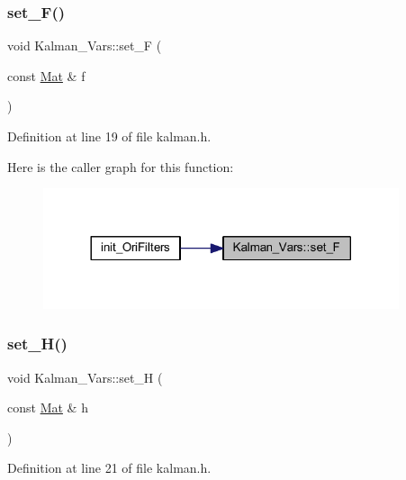 \subsubsection{\texorpdfstring{set\_F()}{set\_F()}}
{\footnotesize\ttfamily void Kalman\+\_\+\+Vars\+::set\+\_\+F (\begin{DoxyParamCaption}\item[{const \mbox{\hyperlink{class_mat}{Mat}} \&}]{f }\end{DoxyParamCaption})\hspace{0.3cm}{\ttfamily [inline]}}



Definition at line 19 of file kalman.\+h.

Here is the caller graph for this function\+:
\nopagebreak
\begin{figure}[H]
\begin{center}
\leavevmode
\includegraphics[width=296pt]{struct_kalman___vars_aaa0914f751fcdac78284162f6c8c2a74_icgraph}
\end{center}
\end{figure}
\mbox{\label{struct_kalman___vars_ac46252628322507a132ae399227a6d18}} 
\subsubsection{\texorpdfstring{set\_H()}{set\_H()}}
{\footnotesize\ttfamily void Kalman\+\_\+\+Vars\+::set\+\_\+H (\begin{DoxyParamCaption}\item[{const \mbox{\hyperlink{class_mat}{Mat}} \&}]{h }\end{DoxyParamCaption})\hspace{0.3cm}{\ttfamily [inline]}}



Definition at line 21 of file kalman.\+h.

